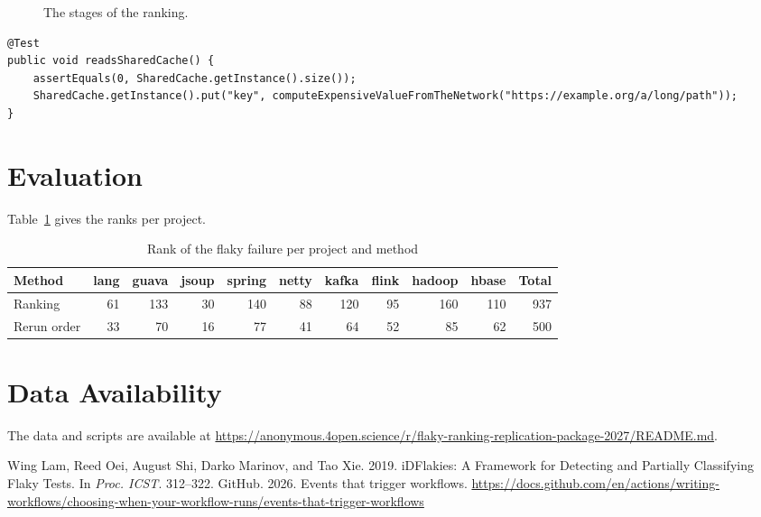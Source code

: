 \begin{figure}[t]
\centering
{}
\caption{The stages of the ranking.}
\label{fig:pipeline}
\end{figure}

\begin{lstlisting}[caption={A test that depends on the order of the suite.}, label={lst:test}]
@Test
public void readsSharedCache() {
    assertEquals(0, SharedCache.getInstance().size());
    SharedCache.getInstance().put("key", computeExpensiveValueFromTheNetwork("https://example.org/a/long/path"));
}
\end{lstlisting}

\section{Evaluation}
\lipsum[4]
Table~\ref{tab:ranks} gives the ranks per project.

\begin{table}[t]
\caption{Rank of the flaky failure per project and method}
\label{tab:ranks}
\begin{tabular*}{\linewidth}{@{\extracolsep{\fill}}lrrrrrrrrrr@{}}
\toprule
Method & lang & guava & jsoup & spring & netty & kafka & flink & hadoop & hbase & Total \\
\midrule
Ranking & 61 & 133 & 30 & 140 & 88 & 120 & 95 & 160 & 110 & 937 \\
Rerun order & 33 & 70 & 16 & 77 & 41 & 64 & 52 & 85 & 62 & 500 \\
\bottomrule
\end{tabular*}
\end{table}

\lipsum[5-7]

\section*{Data Availability}
The data and scripts are available at
\url{https://anonymous.4open.science/r/flaky-ranking-replication-package-2027/README.md}.

\begin{thebibliography}{2}
 Wing Lam, Reed Oei, August Shi, Darko Marinov, and Tao Xie. 2019.
iDFlakies: A Framework for Detecting and Partially Classifying Flaky Tests. In \emph{Proc. ICST}. 312--322.
 GitHub. 2026. Events that trigger workflows.
\url{https://docs.github.com/en/actions/writing-workflows/choosing-when-your-workflow-runs/events-that-trigger-workflows}
\end{thebibliography}

